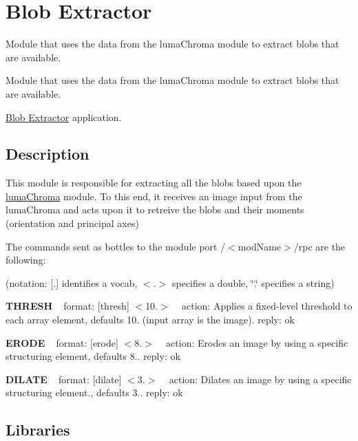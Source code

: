 \section{Blob Extractor}
\label{group__blobExtractor}


Module that uses the data from the luma\+Chroma module to extract blobs that are available.  


Module that uses the data from the luma\+Chroma module to extract blobs that are available. 

\hyperlink{group__blobExtractor}{Blob Extractor} application.\hypertarget{group__seg2cloud_intro_sec}{}\subsection{Description}\label{group__seg2cloud_intro_sec}
This module is responsible for extracting all the blobs based upon the \hyperlink{group__lumaChroma}{luma\+Chroma} module. To this end, it receives an image input from the luma\+Chroma and acts upon it to retreive the blobs and their moments (orientation and principal axes)

The commands sent as bottles to the module port /$<$mod\+Name$>$/rpc are the following\+:

(notation\+: \mbox{[}.\mbox{]} identifies a vocab, $<$.$>$ specifies a double, \char`\"{}.\char`\"{} specifies a string)

{\bfseries T\+H\+R\+E\+SH} ~\newline
 format\+: \mbox{[}thresh\mbox{]} $<$10.$>$ ~\newline
 action\+: Applies a fixed-\/level threshold to each array element, defaults 10. (input array is the image). reply\+: ok

{\bfseries E\+R\+O\+DE} ~\newline
 format\+: \mbox{[}erode\mbox{]} $<$8.$>$ ~\newline
 action\+: Erodes an image by using a specific structuring element, defaults 8.. reply\+: ok

{\bfseries D\+I\+L\+A\+TE} ~\newline
 format\+: \mbox{[}dilate\mbox{]} $<$3.$>$ ~\newline
 action\+: Dilates an image by using a specific structuring element., defaults 3.. reply\+: ok\hypertarget{group__blobExtractor_lib_sec}{}\subsection{Libraries}\label{group__blobExtractor_lib_sec}

